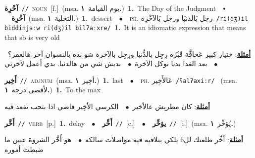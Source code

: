 \documentclass[10pt,a4paper,twoside]{article} %
\begin{document}
\begin{multicols}{2}
{\setlength\topsep{0pt}\textbf{\foreignlanguage{arabic}{آخْرِة}}\ {\color{gray}\texttt{//}\color{black}}\ \textsc{noun}\ [f.]\ \color{gray}(msa. \foreignlanguage{arabic}{يوم القيامة}~\foreignlanguage{arabic}{\textbf{١.}})\color{black}\ \textbf{1.}~The Day of the Judgment\ \ $\smblkdiamond$\ \ \setlength\topsep{0pt}\textbf{\foreignlanguage{arabic}{آخْرِة}}\ \color{gray}(msa. \foreignlanguage{arabic}{التحلية}~\foreignlanguage{arabic}{\textbf{١.}})\color{black}\ \textbf{1.}~dessert\ \ $\bullet$\ \ \textsc{ph.} \color{gray} \foreignlanguage{arabic}{رجل بَالدنيَا ورجل بَالآخْرِة}\color{black}\ {\color{gray}\texttt{/{\sffamily ri(dʒ)il biddinjaːw ri(dʒ)il bilʔaːxre}/}\color{black}}\ \textbf{1.}~It is an idiomatic expression that means that sb is very old\  \begin{flushright}\color{gray}\foreignlanguage{arabic}{\textbf{\underline{\foreignlanguage{arabic}{أمثلة}}}: ختيار كبير عَحافَّة قَبْرُه رِجِل بالدُّنيا ورِجِل بالآخرة شو بده بالنسوان آخر هالعمر؟\ $\bullet$\ \  بعد الغدا بدنا نوكل الآخرة\ $\bullet$\ \  بديش شي من هالدنيا. بدي أعمل لآخرتي}\end{flushright}\color{black}} \vspace{2mm}

{\setlength\topsep{0pt}\textbf{\foreignlanguage{arabic}{أَخِير}}\ {\color{gray}\texttt{//}\color{black}}\ \textsc{adj\textunderscore num}\ \color{gray}(msa. \foreignlanguage{arabic}{أخِير}~\foreignlanguage{arabic}{\textbf{١.}})\color{black}\ \textbf{1.}~last\ \ $\bullet$\ \ \textsc{ph.} \color{gray} \foreignlanguage{arabic}{عَالأَخِير}\color{black}\ {\color{gray}\texttt{/{\sffamily ʕalʔaxiːr}/}\color{black}}\ \color{gray} (msa. \foreignlanguage{arabic}{لأقصى درجة}~\foreignlanguage{arabic}{\textbf{١.}})\color{black}\ \textbf{1.}~To the max\  \begin{flushright}\color{gray}\foreignlanguage{arabic}{\textbf{\underline{\foreignlanguage{arabic}{أمثلة}}}: كان مطربِش عالأخير\ $\bullet$\ \  الكرسي الأخِير فاضي اذا بتحب تقعد فيه}\end{flushright}\color{black}} \vspace{2mm}

{\setlength\topsep{0pt}\textbf{\foreignlanguage{arabic}{أَخَّر}}\ {\color{gray}\texttt{//}\color{black}}\ \textsc{verb}\ [p.]\ \textbf{1.}~delay\ \ $\bullet$\ \ \setlength\topsep{0pt}\textbf{\foreignlanguage{arabic}{أَخِّر}}\ {\color{gray}\texttt{//}\color{black}}\ [c.]\ \ $\bullet$\ \ \setlength\topsep{0pt}\textbf{\foreignlanguage{arabic}{يؤخِّر}}\ {\color{gray}\texttt{//}\color{black}}\ [i.]\ \color{gray}(msa. \foreignlanguage{arabic}{يُؤخِّر}~\foreignlanguage{arabic}{\textbf{١.}})\color{black}\  \begin{flushright}\color{gray}\foreignlanguage{arabic}{\textbf{\underline{\foreignlanguage{arabic}{أمثلة}}}: أخِّر طلعتك لل6 بلكي بتلاقيه فيه مواصلات سالكة\ $\bullet$\ \  هو أَخَّر الشروة عبين ما ضبطت أموره}\end{flushright}\color{black}} \vspace{2mm}


\end{multicols}
\end{document}

